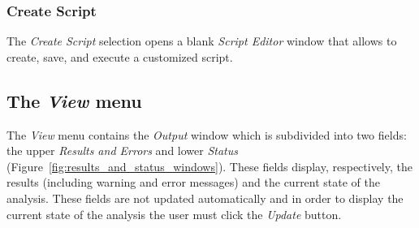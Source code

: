 \subsubsection{Create Script}
The \emph{Create Script} selection opens a blank \emph{Script Editor} window that allows to create, save, and execute  a customized script.

\subsection{The \emph{View} menu}

The \emph{View} menu contains the \emph{Output} window which is subdivided into two fields: the upper \emph{Results and Errors} and lower \emph{Status} (Figure~\ref{fig:results_and_status_windows}). These fields display, respectively, the results (including warning and error messages) and the current state of the analysis. These fields are not updated automatically and in order to display the current state of the analysis the user must click
the \emph{Update} button.


